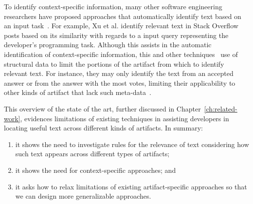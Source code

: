 To identify context-specific information, 
many other software engineering researchers 
have proposed approaches that 
automatically identify text based on an input task~\cite{Ye2016, silva2019, Xu2017}.
For example, Xu et al. identify relevant text in Stack Overflow posts 
based on its similarity with regards to a input query representing the developer's programming task.
Although this assists in the automatic identification of context-specific information, 
this and other techniques~\cite{silva2019, Li2018}
use of structural data to limit the portions of the artifact from which to identify 
relevant text.
For instance, they may only identify the text from an accepted answer or from 
the answer with the most votes,  
limiting their applicability to other kinds of artifact  that lack such meta-data~\cite{Bavota2016, arnaoudova2015}.



  




This overview of the state of the art, further discussed in Chapter~\ref{ch:related-work}, evidences limitations of existing techniques 
in assisting developers in locating useful text across different kinds of artifacts.
In summary:

\begin{enumerate}
    \item it shows the need to investigate rules for the relevance of text 
    considering how such text appears across different types of artifacts;
    \item it shows the need for context-specific approaches; and 
    \item it asks how to relax limitations of existing
    artifact-specific approaches so that we can design 
    more generalizable approaches. 
\end{enumerate}


